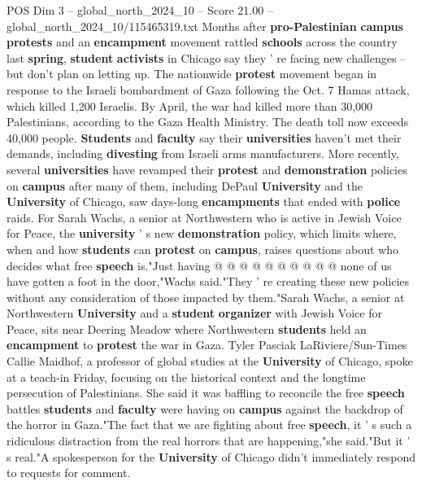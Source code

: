 \begin{textsample}{POS Dim 3 – global\_north\_2024\_10 – Score 21.00 – global\_north\_2024\_10/115465319.txt}  \label{ex:f3_pos_123}
Months after \textbf{pro-Palestinian} \textbf{campus} \textbf{protests} and an \textbf{encampment} movement rattled \textbf{schools} across the country last \textbf{spring}, \textbf{student} \textbf{activists} in Chicago say they ' re facing new challenges -- but don't plan on letting up.
The nationwide \textbf{protest} movement began in response to the Israeli bombardment of Gaza following the Oct. 7 Hamas attack, which killed 1,200 Israelis.
By April, the war had killed more than 30,000 Palestinians, according to the Gaza Health Ministry.
The death toll now exceeds 40,000 people. \textbf{Students} and \textbf{faculty} say their \textbf{universities} haven't met their demands, including \textbf{divesting} from Israeli arms manufacturers.
More recently, several \textbf{universities} have revamped their \textbf{protest} and \textbf{demonstration} policies on \textbf{campus} after many of them, including DePaul \textbf{University} and the \textbf{University} of Chicago, saw days-long \textbf{encampments} that ended with \textbf{police} raids.
For Sarah Wachs, a senior at Northwestern who is active in Jewish Voice for Peace, the \textbf{university} ' s new \textbf{demonstration} policy, which limits where, when and how \textbf{students} can \textbf{protest} on \textbf{campus}, raises questions about who decides what free \textbf{speech} is."Just having @ @ @ @ @ @ @ @ @ @ none of us have gotten a foot in the door,"Wachs said."They ' re creating these new policies without any consideration of those impacted by them."Sarah Wachs, a senior at Northwestern \textbf{University} and a \textbf{student} \textbf{organizer} with Jewish Voice for Peace, sits near Deering Meadow where Northwestern \textbf{students} held an \textbf{encampment} to \textbf{protest} the war in Gaza.
Tyler Pasciak LaRiviere/Sun-Times Callie Maidhof, a professor of global studies at the \textbf{University} of Chicago, spoke at a teach-in Friday, focusing on the historical context and the longtime persecution of Palestinians.
She said it was baffling to reconcile the free \textbf{speech} battles \textbf{students} and \textbf{faculty} were having on \textbf{campus} against the backdrop of the horror in Gaza."The fact that we are fighting about free \textbf{speech}, it ' s such a ridiculous distraction from the real horrors that are happening,"she said."But it ' s real."A spokesperson for the \textbf{University} of Chicago didn't immediately respond to requests for comment.

\end{textsample}
